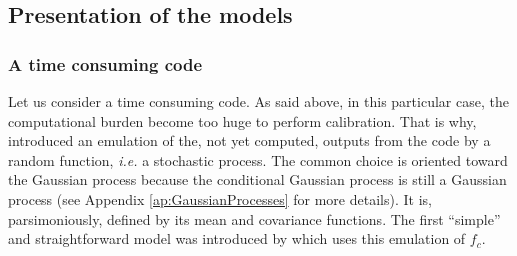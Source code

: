 \documentclass[soumission]{jsfds}
\begin{document}

\subsection{Presentation of the models}

\subsubsection{A time consuming code}

\noindent Let us consider a time consuming code. As said above, in this particular case, the computational burden become too huge to perform calibration. That is why, \citet{sacks1989} introduced an emulation of the, not yet computed, outputs from the code by a random function, \textit{i.e.} a stochastic process. The common choice is oriented toward the Gaussian process because the conditional Gaussian process is still a Gaussian process (see Appendix \ref{ap:GaussianProcesses} for more details). It is, parsimoniously, defined by its mean and covariance functions. The first ``simple'' and straightforward model was introduced by \citet{cox2001} which uses this emulation of $f_c$.

\end{document}
